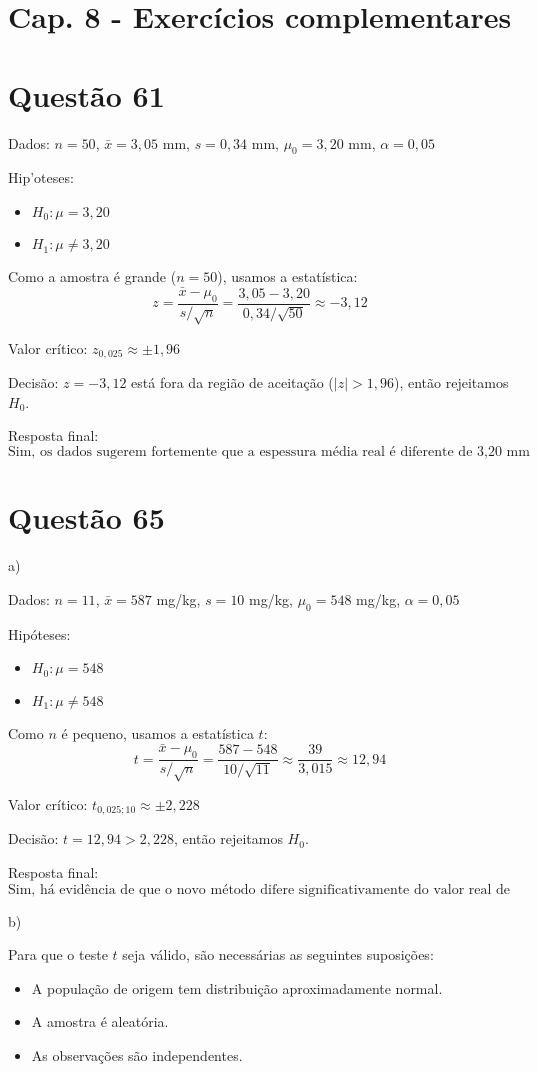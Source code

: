 \documentclass[12pt]{article}
\newcommand{\quest}[1]{\section*{Questão #1}} %
\begin{document}
\section{Cap. 8 - Exercícios complementares}

\quest{61}

Dados: $n = 50$, $\bar{x} = 3{,}05$ mm, $s = 0{,}34$ mm, $\mu_0 = 3{,}20$ mm, $\alpha = 0{,}05$

Hip'oteses:
\begin{itemize}
  \item $H_0: \mu = 3{,}20$
  \item $H_1: \mu \neq 3{,}20$
\end{itemize}

Como a amostra \'{e} grande ($n = 50$), usamos a estat\'istica:
\[
z = \frac{\bar{x} - \mu_0}{s / \sqrt{n}} = \frac{3{,}05 - 3{,}20}{0{,}34 / \sqrt{50}} \approx -3{,}12
\]

Valor cr\'itico: $z_{0{,}025} \approx \pm 1{,}96$

Decis\~ao: $z = -3{,}12$ est\'a fora da regi\~ao de aceita\c{c}\~ao ($|z| > 1{,}96$), ent\~ao rejeitamos $H_0$.

Resposta final:
\[
\boxed{\text{Sim, os dados sugerem fortemente que a espessura m\'edia real \'{e} diferente de 3{,}20 mm}}
\]

\quest{65}

a)

Dados: $n = 11$, $\bar{x} = 587$ mg/kg, $s = 10$ mg/kg, $\mu_0 = 548$ mg/kg, $\alpha = 0{,}05$

Hipóteses:
\begin{itemize}
  \item $H_0: \mu = 548$
  \item $H_1: \mu \neq 548$
\end{itemize}

Como $n$ é pequeno, usamos a estatística $t$:
\[
t = \frac{\bar{x} - \mu_0}{s / \sqrt{n}} = \frac{587 - 548}{10 / \sqrt{11}} \approx \frac{39}{3{,}015} \approx 12{,}94
\]

Valor crítico: $t_{0{,}025; 10} \approx \pm 2{,}228$

Decisão: $t = 12{,}94 > 2{,}228$, então rejeitamos $H_0$.

Resposta final:
\[
\boxed{\text{Sim, há evidência de que o novo método difere significativamente do valor real de 548 mg/kg}}
\]

b)

Para que o teste $t$ seja válido, são necessárias as seguintes suposições:
\begin{itemize}
  \item A população de origem tem distribuição aproximadamente normal.
  \item A amostra é aleatória.
  \item As observações são independentes.
\end{itemize}
\end{document}
